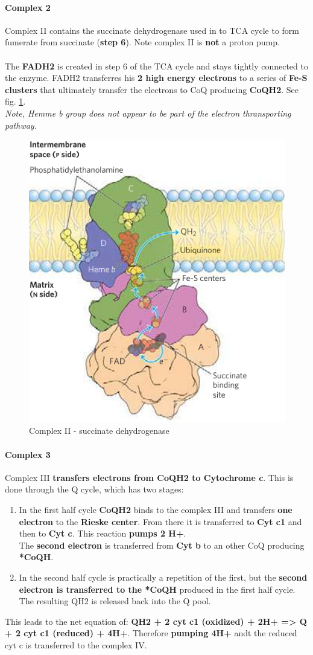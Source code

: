 \documentclass[../main.tex]{subfiles}
\begin{document}
\paragraph{Complex 2}
Complex II contains the succinate dehydrogenase used in to TCA cycle to form fumerate from succinate (\textbf{step 6}). Note complex II is \textbf{not} a proton pump. \\
\\
The \textbf{FADH2} is created in step 6 of the TCA cycle and stays tightly connected to the enzyme. FADH2 transferres his \textbf{2 high energy electrons} to a series of \textbf{Fe-S clusters} that ultimately transfer the electrons to CoQ producing \textbf{CoQH2}. See fig. \ref{ETCC2}.\\
\textit{Note, Hemme b group does not appear to be part of the electron thransporting pathway. }

\begin{figure}[H]
	\centering
	\includegraphics[width = 0.5 \textwidth]{ETCC2}
	\caption{Complex II - succinate dehydrogenase}
	\label{ETCC2}
\end{figure}

\paragraph{Complex 3}
Complex III \textbf{transfers electrons from CoQH2 to Cytochrome c}. This is done through the Q cycle, which has two stages: 
\begin{enumerate}
	\item In the first half cycle \textbf{CoQH2} binds to the complex III and transfers \textbf{one electron} to the \textbf{Rieske center}. From there it is transferred to \textbf{Cyt c1} and then to \textbf{Cyt c}. This reaction \textbf{pumps 2 H+}.\\
	The \textbf{second electron} is transferred from \textbf{Cyt b} to an other CoQ producing \textbf{*CoQH}.
	\item In the second half cycle is practically a repetition of the first, but the \textbf{second electron is transferred to the *CoQH} produced in the first half cycle. The resulting QH2 is released back into the Q pool. 
\end{enumerate}
\noindent
This leads to the net equation of: \textbf{QH2 + 2 cyt c1 (oxidized) + 2H+ => Q + 2 cyt c1 (reduced) + 4H+}. Therefore \textbf{pumping 4H+} andt the reduced cyt c is transferred to the complex IV. 
\end{document}
